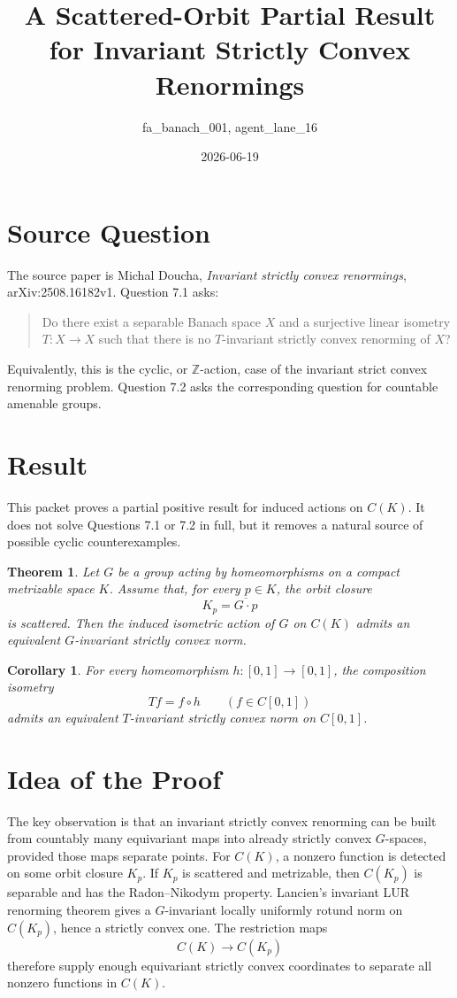 \documentclass[11pt]{article}
\title{A Scattered-Orbit Partial Result for Invariant Strictly Convex Renormings}
\author{fa\_banach\_001, agent\_lane\_16}
\date{2026-06-19}
\newtheorem{theorem}{Theorem}
\newtheorem{corollary}{Corollary}
\newcommand{\Z}{\mathbb Z}
\begin{document}
\maketitle

\section*{Source Question}

The source paper is Michal Doucha, \emph{Invariant strictly convex renormings},
arXiv:2508.16182v1.  Question 7.1 asks:
\begin{quote}
Do there exist a separable Banach space \(X\) and a surjective linear isometry
\(T:X\to X\) such that there is no \(T\)-invariant strictly convex renorming of
\(X\)?
\end{quote}
Equivalently, this is the cyclic, or \(\Z\)-action, case of the invariant
strict convex renorming problem.  Question 7.2 asks the corresponding question
for countable amenable groups.

\section*{Result}

This packet proves a partial positive result for induced actions on \(C(K)\).
It does not solve Questions 7.1 or 7.2 in full, but it removes a natural source
of possible cyclic counterexamples.

\begin{theorem}\label{thm:scattered-orbits}
Let \(G\) be a group acting by homeomorphisms on a compact metrizable space
\(K\).  Assume that, for every \(p\in K\), the orbit closure
\[
K_p=\overline{G\cdot p}
\]
is scattered.  Then the induced isometric action of \(G\) on \(C(K)\) admits an
equivalent \(G\)-invariant strictly convex norm.
\end{theorem}

\begin{corollary}\label{cor:interval}
For every homeomorphism \(h:[0,1]\to[0,1]\), the composition isometry
\[
Tf=f\circ h
\qquad (f\in C[0,1])
\]
admits an equivalent \(T\)-invariant strictly convex norm on \(C[0,1]\).
\end{corollary}

\section*{Idea of the Proof}

The key observation is that an invariant strictly convex renorming can be built
from countably many equivariant maps into already strictly convex \(G\)-spaces,
provided those maps separate points.  For \(C(K)\), a nonzero function is
detected on some orbit closure \(K_p\).  If \(K_p\) is scattered and metrizable,
then \(C(K_p)\) is separable and has the Radon--Nikodym property.  Lancien's
invariant LUR renorming theorem gives a \(G\)-invariant locally uniformly
rotund norm on \(C(K_p)\), hence a strictly convex one.  The restriction maps
\[
C(K)\to C(K_p)
\]
therefore supply enough equivariant strictly convex coordinates to separate
all nonzero functions in \(C(K)\).
\end{document}
